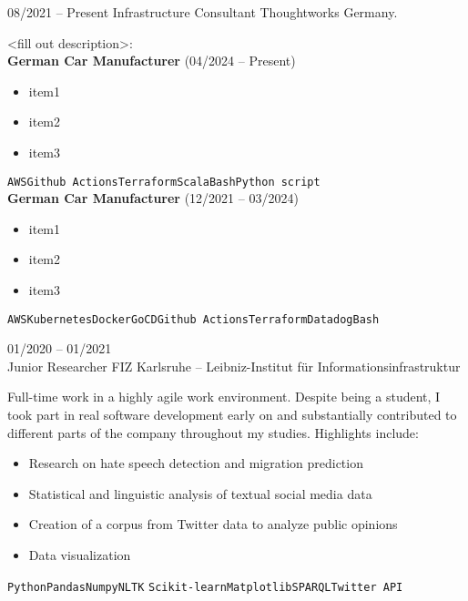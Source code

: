 \documentclass[9pt]{developercv} %
\begin{document}
	

    \begin{entrylist}
    	\entry
    		{08/2021 -- Present}
    		{Infrastructure Consultant}
    		{Thoughtworks Germany.}
    		{<fill out description>:\\

            \textbf{German Car Manufacturer} {\footnotesize(04/2024 -- Present)}
            \begin{itemize}
                \item item1
                \item item2
                \item item3

            \end{itemize}
      \texttt{AWS}\slashsep\texttt{Github Actions}\slashsep\texttt{Terraform}\slashsep\texttt{Scala}\slashsep\texttt{Bash}\slashsep\texttt{Python script}\\

            \textbf{German Car Manufacturer} {\footnotesize(12/2021 -- 03/2024)}
            \begin{itemize}
                \item item1
                \item item2
                \item item3
            \end{itemize}
      \texttt{AWS}\slashsep\texttt{Kubernetes}\slashsep\texttt{Docker}\slashsep\texttt{GoCD}\slashsep\texttt{Github Actions}\slashsep\texttt{Terraform}\slashsep\texttt{Datadog}\slashsep\texttt{Bash}

        }
    	\entry
    		{01/2020 -- 01/2021\\}
    		{Junior Researcher}
    		{FIZ Karlsruhe – Leibniz-Institut für Informationsinfrastruktur}
    		{Full-time work in a highly agile work environment. Despite being a student, I took part in real software development early on and substantially contributed to different parts of the company throughout my studies. Highlights include:
            \begin{itemize}
                \item Research on hate speech detection and migration prediction
                \item Statistical and linguistic analysis of textual social media data
                \item Creation of a corpus from Twitter data to analyze public opinions
                \item Data visualization
            \end{itemize}
            \texttt{Python}\slashsep\texttt{Pandas}\slashsep\texttt{Numpy}\slashsep\texttt{NLTK}
            \texttt{Scikit-learn}\slashsep\texttt{Matplotlib}\slashsep\texttt{SPARQL}\slashsep\texttt{Twitter API}
            }
    \end{entrylist}
\end{document}
